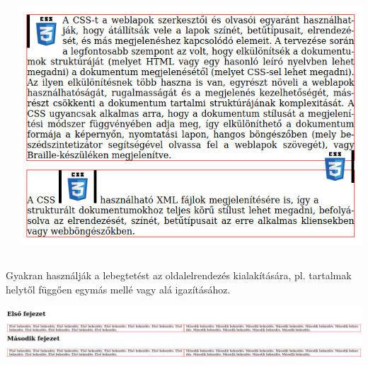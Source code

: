\begin{frame}
  \begin{columns}[c]
      \begin{exampleblock}{}
        \fontsize{7}{8} \selectfont
        
        
      \end{exampleblock}
      \begin{exampleblock}{}
        \includegraphics[width=\textwidth]{lebeg1.png}
      \end{exampleblock}
  \end{columns}
\end{frame}

\begin{frame}
  Gyakran használják a lebegtetést az oldalelrendezés kialakítására, pl. tartalmak helytől függően egymás mellé vagy alá igazításához.
  \vfill
  \begin{center}
    \includegraphics[width=\textwidth]{lebeg21.png}\\
  \end{center}
\end{frame}

